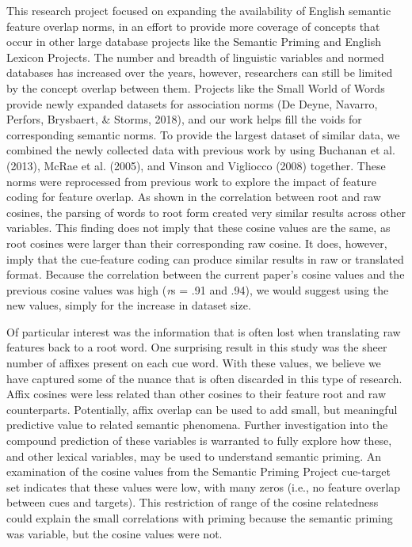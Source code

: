 \documentclass[english,,man]{apa6}
\begin{document}
This research project focused on expanding the availability of English semantic feature overlap norms, in an effort to provide more coverage of concepts that occur in other large database projects like the Semantic Priming and English Lexicon Projects. The number and breadth of linguistic variables and normed databases has increased over the years, however, researchers can still be limited by the concept overlap between them. Projects like the Small World of Words provide newly expanded datasets for association norms (De Deyne, Navarro, Perfors, Brysbaert, \& Storms, 2018), and our work helps fill the voids for corresponding semantic norms. To provide the largest dataset of similar data, we combined the newly collected data with previous work by using Buchanan et al. (2013), McRae et al. (2005), and Vinson and Vigliocco (2008) together. These norms were reprocessed from previous work to explore the impact of feature coding for feature overlap. As shown in the correlation between root and raw cosines, the parsing of words to root form created very similar results across other variables. This finding does not imply that these cosine values are the same, as root cosines were larger than their corresponding raw cosine. It does, however, imply that the cue-feature coding can produce similar results in raw or translated format. Because the correlation between the current paper's cosine values and the previous cosine values was high (\emph{r}s = .91 and .94), we would suggest using the new values, simply for the increase in dataset size.

Of particular interest was the information that is often lost when translating raw features back to a root word. One surprising result in this study was the sheer number of affixes present on each cue word. With these values, we believe we have captured some of the nuance that is often discarded in this type of research. Affix cosines were less related than other cosines to their feature root and raw counterparts. Potentially, affix overlap can be used to add small, but meaningful predictive value to related semantic phenomena. Further investigation into the compound prediction of these variables is warranted to fully explore how these, and other lexical variables, may be used to understand semantic priming. An examination of the cosine values from the Semantic Priming Project cue-target set indicates that these values were low, with many zeros (i.e., no feature overlap between cues and targets). This restriction of range of the cosine relatedness could explain the small correlations with priming because the semantic priming was variable, but the cosine values were not.
\end{document}
